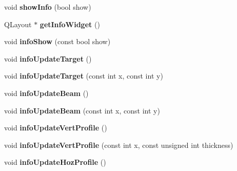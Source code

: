 \begin{DoxyCompactItemize}
\item 
\hypertarget{classimageInfo_ab9c63ac1d0a4a14844c4135d5c44202e}{
void {\bfseries showInfo} (bool show)}
\label{classimageInfo_ab9c63ac1d0a4a14844c4135d5c44202e}

\item 
\hypertarget{classimageInfo_a6ed71ac5cb9612324f6e9c9755747470}{
QLayout $\ast$ {\bfseries getInfoWidget} ()}
\label{classimageInfo_a6ed71ac5cb9612324f6e9c9755747470}

\item 
\hypertarget{classimageInfo_ac031e6c46d567d2a0215bc025eadb982}{
void {\bfseries infoShow} (const bool show)}
\label{classimageInfo_ac031e6c46d567d2a0215bc025eadb982}

\item 
\hypertarget{classimageInfo_abeae02809096ab62ba004af2b70197da}{
void {\bfseries infoUpdateTarget} ()}
\label{classimageInfo_abeae02809096ab62ba004af2b70197da}

\item 
\hypertarget{classimageInfo_a1ec49f20e5899a70ad6cbbc2182e1899}{
void {\bfseries infoUpdateTarget} (const int x, const int y)}
\label{classimageInfo_a1ec49f20e5899a70ad6cbbc2182e1899}

\item 
\hypertarget{classimageInfo_a101b262f8a75d9bd7973c08d3e9a0696}{
void {\bfseries infoUpdateBeam} ()}
\label{classimageInfo_a101b262f8a75d9bd7973c08d3e9a0696}

\item 
\hypertarget{classimageInfo_a0fdb14d460ee5f268e3345302f0e20df}{
void {\bfseries infoUpdateBeam} (const int x, const int y)}
\label{classimageInfo_a0fdb14d460ee5f268e3345302f0e20df}

\item 
\hypertarget{classimageInfo_a0c826adb5b824b6d454e0f8c95fe081d}{
void {\bfseries infoUpdateVertProfile} ()}
\label{classimageInfo_a0c826adb5b824b6d454e0f8c95fe081d}

\item 
\hypertarget{classimageInfo_a415347b0bbd417023a4790f955ea1695}{
void {\bfseries infoUpdateVertProfile} (const int x, const unsigned int thickness)}
\label{classimageInfo_a415347b0bbd417023a4790f955ea1695}

\item 
\hypertarget{classimageInfo_a2605cb9a76df62f861f1fd36b1083cec}{
void {\bfseries infoUpdateHozProfile} ()}
\label{classimageInfo_a2605cb9a76df62f861f1fd36b1083cec}


\end{DoxyCompactItemize}
